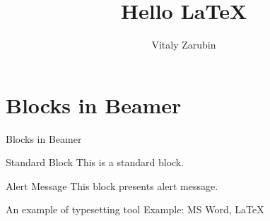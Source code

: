 \documentclass{beamer}
\begin{document}
    \title{Hello LaTeX}
    \author{Vitaly Zarubin}

    \begin{frame}
        \titlepage
    \end{frame}

    \section{Blocks in Beamer}\label{sec:blocks-in-beamer}
    \begin{frame}{Blocks in Beamer}
        \begin{block}{Standard Block}
            This is a standard block.
        \end{block}
        \vskip0.35cm%
        \begin{alertblock}{Alert Message}
            This block presents alert message.
        \end{alertblock}
        \vskip0.35cm%
        \begin{exampleblock}{An example of typesetting tool}
            Example: MS Word, \LaTeX{}
        \end{exampleblock}
    \end{frame}
\end{document}
